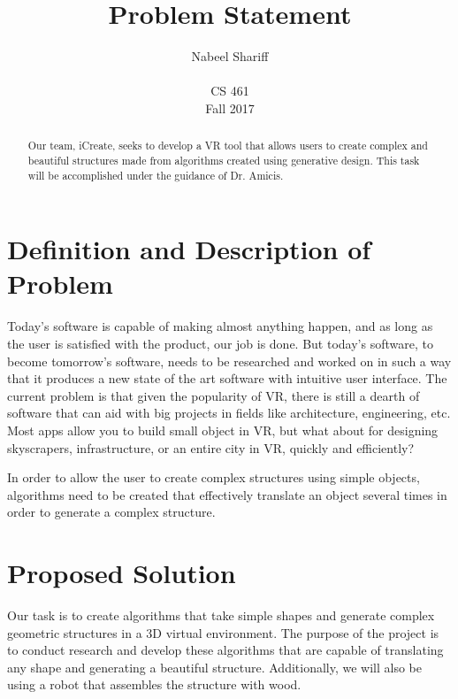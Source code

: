 \documentclass[letterpaper,10pt,onecolumn]{IEEEtran}
\title{Problem Statement}
\author{Nabeel Shariff\\ ~ \\CS 461\\Fall 2017}
\begin{document}
\maketitle

\begin{abstract}


\noindent
Our team, iCreate, seeks to develop a VR tool that allows users to create complex and beautiful structures made from algorithms created using generative design. This task will be accomplished under the guidance of Dr. Amicis.

\end{abstract}

\newpage

\section{\textbf{Definition and Description of Problem }}

Today's software is capable of making almost anything happen, and as long as the user is satisfied with the product, our job is done. But today’s software, to become tomorrow’s software, needs to be researched and worked on in such a way that it produces a new state of the art software with intuitive user interface. The current problem is that given the popularity of VR, there is still a dearth of software that can aid with big projects in fields like architecture, engineering, etc. Most apps allow you to build small object in VR, but what about for designing skyscrapers, infrastructure, or an entire city in VR, quickly and efficiently? 

In order to allow the user to create complex structures using simple objects, algorithms need to be created that effectively translate an object several times in order to generate a complex structure.  

\section{\textbf{Proposed Solution}}

Our task is to create algorithms that take simple shapes and generate complex geometric structures in a 3D virtual environment.  The purpose of the project is to conduct research and develop these algorithms that are capable of translating any shape and generating a beautiful structure. Additionally, we will also be using a robot that assembles the structure with wood.  
\end{document}
